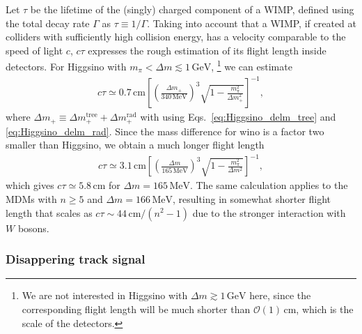 \documentclass[12pt,twoside,book]{article}
\begin{document}
Let $\tau$ be the lifetime of the (singly) charged component of a WIMP, defined using the total decay rate $\Gamma$ as $\tau \equiv 1/\Gamma$.
Taking into account that a WIMP, if created at colliders with sufficiently high collision energy, has a velocity comparable to the speed of light $c$, $c \tau$ expresses the rough estimation of its flight length inside detectors.
For Higgsino with $m_\pi < \Delta m \lesssim 1\,\mathrm{GeV}$,
\footnote{
  We are not interested in Higgsino with $\Delta m \gtrsim 1\, \mathrm{GeV}$ here, since the corresponding flight length will be much shorter than $\mathcal{O} (1)\, \mathrm{cm}$, which is the scale of the detectors.
}
we can estimate \cite{Chen:1995yu,Thomas:1998wy}
\begin{align}
  c \tau \simeq 0.7\, \mathrm{cm}
  \left[ \left( \frac{\Delta m_{+}}{340\,\mathrm{MeV}} \right)^3
  \sqrt{1 - \frac{m_\pi^2}{\Delta m_{+}^2}} \right]^{-1},
\end{align}
where $\Delta m_{+} \equiv \Delta m_{+}^{\mathrm{tree}} + \Delta m_{+}^{\mathrm{rad}}$ with using Eqs.~\eqref{eq:Higgsino_delm_tree} and \eqref{eq:Higgsino_delm_rad}.
Since the mass difference for wino is a factor two smaller than Higgsino, we obtain a much longer flight length
\begin{align}
  c \tau \simeq 3.1\, \mathrm{cm} \left[
  \left( \frac{\Delta m}{165\, \mathrm{MeV}} \right)^3
  \sqrt{1 - \frac{m_\pi^2}{\Delta m^2}} \right]^{-1},
\end{align}
which gives $c\tau \simeq 5.8\,\mathrm{cm}$ for $\Delta m = 165\,\mathrm{MeV}$.
The same calculation applies to the MDMs with $n \geq 5$ and $\Delta m = 166\, \mathrm{MeV}$, resulting in somewhat shorter flight length that scales as $c \tau \sim 44\, \mathrm{cm} / (n^2 - 1)$ \cite{Cirelli:2005uq} due to the stronger interaction with $W$ bosons.


\subsubsection*{Disappering track signal}
\end{document}
